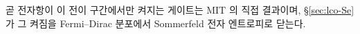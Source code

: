 곧 전자항이 이 전이 구간에서만 켜지는 게이트는 MIT 의 직접 결과이며, \S\ref{sec:lco-Se} 가 그 켜짐을
Fermi--Dirac 분포에서 Sommerfeld 전자 엔트로피로 닫는다.
%
%
%
%
%
